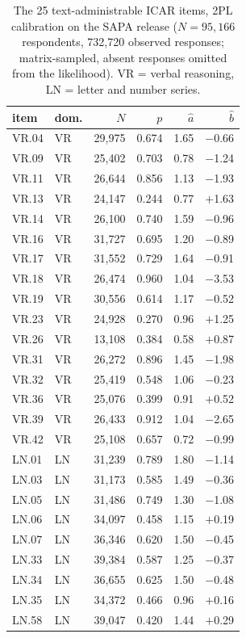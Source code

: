\begin{table}[t]
\caption{The 25 text-administrable ICAR items, 2PL calibration on the SAPA release ($N=95{,}166$ respondents, 732{,}720 observed responses; matrix-sampled, absent responses omitted from the likelihood). VR = verbal reasoning, LN = letter and number series.}
\label{tab:calibration}\centering\small
\begin{tabular}{llrrrr}\toprule
item & dom. & $N$ & $p$ & $\hat a$ & $\hat b$ \\\midrule
VR.04 & VR & 29{,}975 & 0.674 & 1.65 & $-$0.66 \\
VR.09 & VR & 25{,}402 & 0.703 & 0.78 & $-$1.24 \\
VR.11 & VR & 26{,}644 & 0.856 & 1.13 & $-$1.93 \\
VR.13 & VR & 24{,}147 & 0.244 & 0.77 & $+$1.63 \\
VR.14 & VR & 26{,}100 & 0.740 & 1.59 & $-$0.96 \\
VR.16 & VR & 31{,}727 & 0.695 & 1.20 & $-$0.89 \\
VR.17 & VR & 31{,}552 & 0.729 & 1.64 & $-$0.91 \\
VR.18 & VR & 26{,}474 & 0.960 & 1.04 & $-$3.53 \\
VR.19 & VR & 30{,}556 & 0.614 & 1.17 & $-$0.52 \\
VR.23 & VR & 24{,}928 & 0.270 & 0.96 & $+$1.25 \\
VR.26 & VR & 13{,}108 & 0.384 & 0.58 & $+$0.87 \\
VR.31 & VR & 26{,}272 & 0.896 & 1.45 & $-$1.98 \\
VR.32 & VR & 25{,}419 & 0.548 & 1.06 & $-$0.23 \\
VR.36 & VR & 25{,}076 & 0.399 & 0.91 & $+$0.52 \\
VR.39 & VR & 26{,}433 & 0.912 & 1.04 & $-$2.65 \\
VR.42 & VR & 25{,}108 & 0.657 & 0.72 & $-$0.99 \\
LN.01 & LN & 31{,}239 & 0.789 & 1.80 & $-$1.14 \\
LN.03 & LN & 31{,}173 & 0.585 & 1.49 & $-$0.36 \\
LN.05 & LN & 31{,}486 & 0.749 & 1.30 & $-$1.08 \\
LN.06 & LN & 34{,}097 & 0.458 & 1.15 & $+$0.19 \\
LN.07 & LN & 36{,}346 & 0.620 & 1.50 & $-$0.45 \\
LN.33 & LN & 39{,}384 & 0.587 & 1.25 & $-$0.37 \\
LN.34 & LN & 36{,}655 & 0.625 & 1.50 & $-$0.48 \\
LN.35 & LN & 34{,}372 & 0.466 & 0.96 & $+$0.16 \\
LN.58 & LN & 39{,}047 & 0.420 & 1.44 & $+$0.29 \\
\bottomrule\end{tabular}\end{table}
